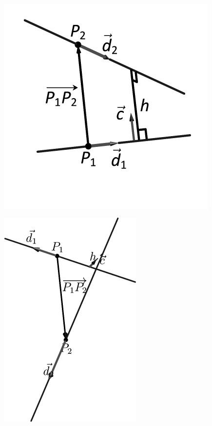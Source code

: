 \documentclass[10pt]{article}
\begin{document}
\includegraphics{figlines_dist2_3DBW.pdf}
\texttt{}

\includegraphics{figlines_dist2temp_3DBW.pdf}
\texttt{}
\end{document}
